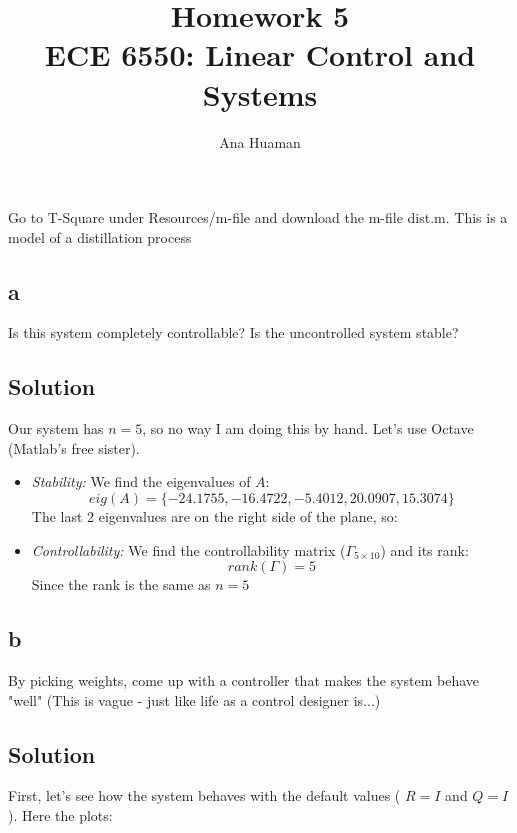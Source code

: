 \documentclass[10pt,a4paper]{article}
\author{Ana Huaman}
\title{\textbf{Homework 5} \\ ECE 6550: Linear Control and Systems}
\date{}
\begin{document}
\maketitle

\section{}
Go to T-Square under Resources/m-file and download the m-file dist.m. This is a model of a distillation process

\subsection*{a}
Is this system completely controllable? Is the uncontrolled system stable?

\subsection*{Solution}
Our system has $n=5$, so no way I am doing this by hand. Let's use Octave (Matlab's free sister). 

\begin{itemize}
\item{ \textit{Stability:} We find the eigenvalues of $A$:
\[ eig(A) = \{-24.1755, -16.4722, -5.4012, 20.0907, 15.3074 \} \]
The last $2$ eigenvalues are on the right side of the plane, so:
\begin{center}
\end{center} }

\item{ \textit{Controllability:} We find the controllability matrix ($\Gamma_{5 \times 10}$) and its rank:
\[ rank(\Gamma) = 5 \]
Since the rank is the same as $n = 5$
\begin{center}
\end{center} }
\end{itemize}

\subsection*{b}
By picking weights, come up with a controller that makes the system behave "well" (This is vague - just like life as a control designer is...)

\subsection*{Solution}
First, let's see how the system behaves with the default values ( $R = I$ and $Q = I$ ). Here the plots:
\end{document}
